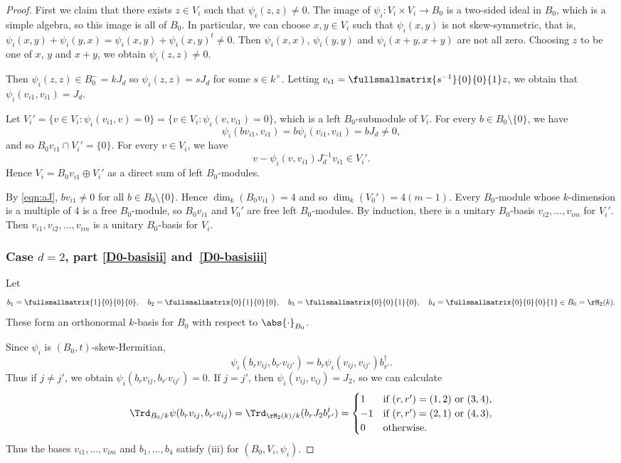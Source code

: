 \begin{proof}
First we claim that there exists $z \in V_i$ such that $\psi_i(z,z) \neq 0$.
The image of $\psi_i \colon V_i \times V_i \to B_0$ is a two-sided ideal in $B_0$, which is a simple algebra, so this image is all of $B_0$.
In particular, we can choose $x,y \in V_i$ such that $\psi_i(x,y)$ is not skew-symmetric, that is, $\psi_i(x,y) + \psi_i(y,x) = \psi_i(x,y) + \psi_i(x,y)^t \neq 0$.
Then $\psi_i(x,x)$, $\psi_i(y,y)$ and $\psi_i(x+y,x+y)$ are not all zero.
Choosing $z$ to be one of $x$, $y$ and $x+y$, we obtain $\psi_i(z,z) \neq 0$.

Then $\psi_i(z,z) \in B_0^- = k J_d$ so $\psi_i(z,z) = s J_d$ for some $s \in k^\times$.
Letting $v_{i1} = \fullsmallmatrix{s^{-1}}{0}{0}{1}z$, we obtain that $\psi_i(v_{i1}, v_{i1}) = J_d$.

Let $V_i' = \{ v \in V_i : \psi_i(v_{i1}, v) = 0 \} = \{ v \in V_i : \psi_i(v, v_{i1}) = 0 \}$, which is a left $B_0$-submodule of $V_i$.
For every $b \in B_0 \setminus \{0\}$, we have
\begin{equation} \label{eqn:aJ}
\psi_i(bv_{i1}, v_{i1}) = b\psi_i(v_{i1}, v_{i1}) = bJ_d \neq 0,
\end{equation}
and so $B_0v_{i1} \cap V_i' = \{ 0 \}$.
For every $v \in V_i$, we have
\[
v - \psi_i(v, v_{i1}) J_d^{-1} v_{i1} \in V_i'.
\]
Hence $V_i = B_0v_{i1} \oplus V_i'$ as a direct sum of left $B_0$-modules.

By \eqref{eqn:aJ}, $bv_{i1} \neq 0$ for all $b \in B_0 \setminus \{0\}$.
Hence $\dim_k(B_0v_{i1}) = 4$ and so $\dim_k(V_0') = 4(m-1)$.
Every $B_0$-module whose $k$-dimension is a multiple of 4 is a free $B_0$-module,
so $B_0v_{i1}$ and $V_0'$ are free left $B_0$-modules.
By induction, there is a unitary $B_0$-basis $v_{i2}, \dotsc, v_{im}$ for $V_i'$.
Then $v_{i1}, v_{i2}, \dotsc, v_{im}$ is a unitary $B_0$-basis for $V_i$.

\subsubsection*{Case $d=2$, part \eqref{D0-basisii} and~\eqref{D0-basisiii}}
Let
\[
b_1 = \fullsmallmatrix{1}{0}{0}{0},
\quad b_2 = \fullsmallmatrix{0}{1}{0}{0},
\quad b_3 = \fullsmallmatrix{0}{0}{1}{0},
\quad b_4 = \fullsmallmatrix{0}{0}{0}{1} \in B_0 = \rM_2(k).
\]
These form an orthonormal $k$-basis for $B_0$ with respect to $\abs{\cdot}_{B_0}$.

Since $\psi_i$ is $(B_0,t)$-skew-Hermitian,
\[
\psi_i(b_rv_{ij}, b_{r'}v_{ij'}) = b_r\psi_i(v_{ij}, v_{ij'})b_{r'}^\dag.
\]
Thus if $j \neq j'$, we obtain $\psi_i(b_rv_{ij}, b_{r'}v_{ij'}) = 0$.
If $j = j'$, then $\psi_i(v_{ij}, v_{ij}) = J_2$, so we can calculate
\[
\Trd_{B_0/k} \psi(b_rv_{ij}, b_{r'}v_{ij}) = \Trd_{\rM_2(k)/k}(b_rJ_2b_{r'}^t)
= \begin{cases}
1 &\text{if } (r,r') = (1,2) \text{ or } (3,4),
\\ -1 &\text{if } (r,r') = (2,1) \text{ or } (4,3),
\\ 0 &\text{otherwise}.
\end{cases}
\]
Thus the bases $v_{i1}, \dotsc, v_{im}$ and $b_1, \dotsc, b_4$ satisfy (iii) for $(B_0, V_i, \psi_i)$.
\end{proof}

